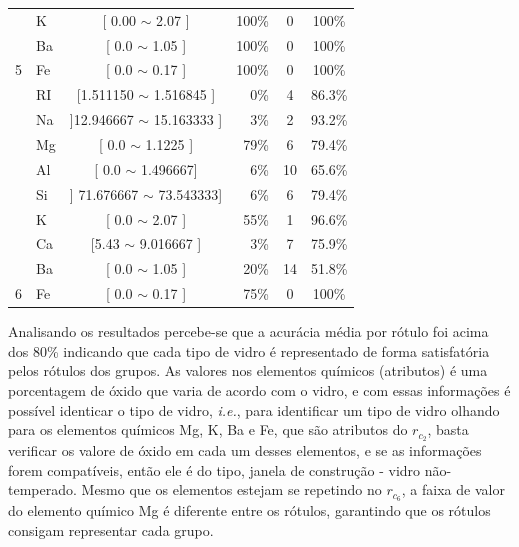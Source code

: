 \begin{table}[!h]
{\begin{tabular}{llcrcc}
                                            & K     & [ 0.00 $\sim$  2.07 ]     & 100\%  & 0 & 100\% \\ 
                                            & Ba     & [ 0.0 $\sim$  1.05 ]    & 100\%  & 0 & 100\% \\  
\multirow{-3}{*}{5}                         & Fe    & [ 0.0 $\sim$  0.17 ]     & 100\%  & 0 & 100\% \\  \hline
                                            & RI     & [1.511150 $\sim$  1.516845 ] & 0\%  & 4  & 86.3\% \\ 
                                            & Na     & ]12.946667 $\sim$  15.163333 ] & 3\%  & 2  & 93.2\% \\ 
                                             & Mg    & [ 0.0 $\sim$  1.1225 ]    & 79\%  &6  & 79.4\%\\ 
                                             & Al    & [ 0.0 $\sim$  1.496667]      & 6\%  & 10  & 65.6\%\\
                                            & Si    & ] 71.676667 $\sim$  73.543333]      & 6\%  & 6  & 79.4\%\\
                                            & K     & [  0.0 $\sim$  2.07 ]    & 55\%  & 1  & 96.6\% \\ 
                                            & Ca     & [5.43 $\sim$ 9.016667 ]    & 3\%  & 7  & 75.9\% \\ 
                                            & Ba     & [ 0.0 $\sim$ 1.05 ]    & 20\%  & 14  & 51.8\% \\ 
\multirow{-9}{*}{6}                         & Fe    & [ 0.0 $\sim$  0.17 ]     & 75\%  & 0  & 100\% \\  \hline\hline

\end{tabular}
}
\end{table}

Analisando os resultados percebe-se que a acurácia média por rótulo foi acima dos 80\% indicando que cada tipo de vidro  é representado de forma satisfatória pelos rótulos dos grupos. As valores nos elementos químicos (atributos) é uma porcentagem de óxido que varia de acordo com o vidro, e  com essas informações é possível identicar o tipo de vidro, \textit{i.e.}, para identificar um tipo de vidro olhando para os elementos químicos Mg, K, Ba e Fe, que são atributos do ${r_{c_2}}$, basta verificar os valore de óxido em cada um desses elementos, e se as informações forem compatíveis, então ele é do tipo, janela de construção - vidro não-temperado. Mesmo que os elementos estejam se repetindo no ${r_{c_6}}$, a faixa de valor do elemento químico Mg é diferente entre os rótulos, garantindo que os rótulos consigam representar cada grupo. 


